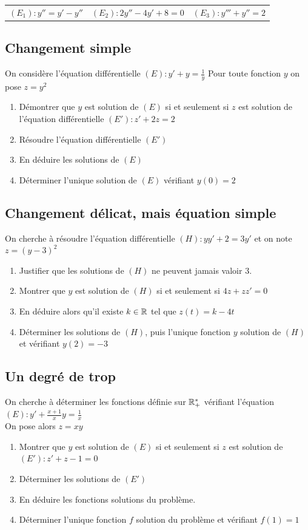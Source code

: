 \documentclass[oneside,12pt]{book}          %
\begin{document}
\begin{tabular}{p{} p{} p{}}
    $(E_1):y''=y'-y''$ & $(E_2):2y''-4y'+8=0$ & $(E_3):y'''+y''=2$ \\
\end{tabular}



\subsection{Changement simple}
On considère l'équation différentielle $(E):y'+y=\frac{1}{y}$
Pour toute fonction $y$ on pose $z=y^2$

\begin{enumerate}
    \item Démontrer que $y$ est solution de $(E)$ si et seulement si $z$ est solution de l'équation différentielle $(E'):z'+2z=2$
    \item Résoudre l'équation différentielle $(E')$
    \item En déduire les solutions de $(E)$
    \item Déterminer l'unique solution de $(E)$ vérifiant $y(0)=2$
\end{enumerate}



\subsection{Changement délicat, mais équation simple}
On cherche à résoudre l'équation différentielle $(H):yy'+2=3y'$ et on note $z=(y-3)^2$

\begin{enumerate}
    \item Justifier que les solutions de $(H)$ ne peuvent jamais valoir 3.
    \item Montrer que $y$ est solution de $(H)$ si et seulement si $4z+zz'=0$
    \item En déduire alors qu'il existe $k\in{\mathbb R}$ tel que $z(t)=k-4t$
    \item Déterminer les solutions de $(H)$, puis l'unique fonction $y$ solution de $(H)$ et vérifiant $y(2)=-3$
\end{enumerate}



\subsection{Un degré de trop}
On cherche à déterminer les fonctions définie sur ${\mathbb R}_+^*$ vérifiant l'équation $(E):y'+\frac{x+1}{x}y=\frac{1}{x}$\\
On pose alors $z=xy$
\begin{enumerate}
	\item Montrer que $y$ est solution de $(E)$ si et seulement si $z$ est solution de $(E'):z'+z-1=0$
	\item Déterminer les solutions de $(E')$
	\item En déduire les fonctions solutions du problème.
	\item Déterminer l'unique fonction $f$ solution du problème et vérifiant $f(1)=1$
\end{enumerate}
\end{document}
